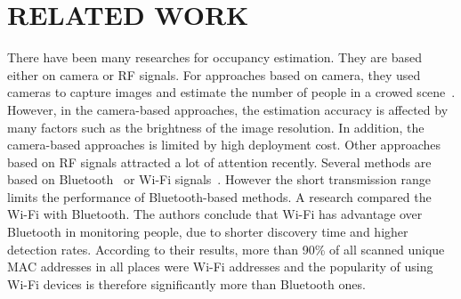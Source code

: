 \chapter{RELATED WORK}
There have been many researches for occupancy estimation. They are based either on camera or RF signals.
For approaches based on camera, they used cameras to capture images and estimate the number of people in a crowed scene~\cite{Ma_2013_CVPR,Pe_count}. However, in the camera-based approaches, the estimation accuracy is affected by many factors such as the brightness of the image resolution. In addition, the camera-based approaches is limited by high deployment cost.
Other approaches based on RF signals attracted a lot of attention recently. Several methods are based on Bluetooth~\cite{B_ad_hoc} or Wi-Fi signals~\cite{W_power}. However the short transmission range limits the performance of Bluetooth-based methods. A research compared the Wi-Fi with Bluetooth. The authors conclude that Wi-Fi has advantage over Bluetooth in monitoring people, due to shorter discovery time and higher detection rates\cite{quteprints71808}. According to their results,  more than 90\% of all scanned unique MAC addresses in all places were Wi-Fi addresses and the popularity of using Wi-Fi devices is therefore significantly more than Bluetooth ones.
